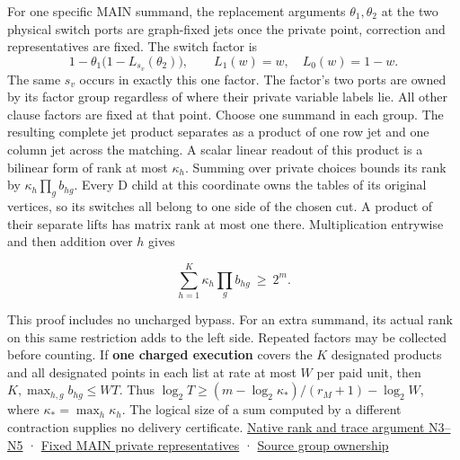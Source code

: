 \documentclass[11pt,a4paper]{article}
\begin{document}
For one specific MAIN summand, the replacement arguments
\(\theta_1,\theta_2\) at the two physical switch ports are graph-fixed
jets once the private point, correction and representatives are fixed.
The switch factor is \[
      1-\theta_1\bigl(1-L_{s_v}(\theta_2)\bigr),
      \qquad L_1(w)=w,\quad L_0(w)=1-w .
\] The same \(s_v\) occurs in exactly this one factor. The factor's two
ports are owned by its factor group regardless of where their private
variable labels lie. All other clause factors are fixed at that point.
Choose one summand in each group. The resulting complete jet product
separates as a product of one row jet and one column jet across the
matching. A scalar linear readout of this product is a bilinear form of
rank at most \(\kappa_h\). Summing over private choices bounds its rank
by \(\kappa_h\prod_g b_{hg}\). Every D child at this coordinate owns the
tables of its original vertices, so its switches all belong to one side
of the chosen cut. A product of their separate lifts has matrix rank at
most one there. Multiplication entrywise and then addition over \(h\)
gives

\[
                    \sum_{h=1}^{K}\kappa_h\prod_g b_{hg}
                         \ \ge\ 2^m.                                \tag{C3}
\]

This proof includes no uncharged bypass. For an extra summand, its
actual rank on this same restriction adds to the left side. Repeated
factors may be collected before counting. If \textbf{one charged
execution} covers the \(K\) designated products and all designated
points in each list at rate at most \(W\) per paid unit, then
\(K,\max_{h,g}b_{hg}\le WT\). Thus
\(\log_2 T\ge (m-\log_2\kappa_*)/(r_M+1)-\log_2 W\), where
\(\kappa_*=\max_h\kappa_h\). The logical size of a sum computed by a
different contraction supplies no delivery certificate.
\hyperref[v8-section-native-escape]{Native rank and trace argument N3--N5}
·
\href{https://github.com/openai/math/blob/main/preprints/The-Exponential-Time-Hypothesis-is-False-October-25-2026/build/main_full_version.tex\#L1810}{Fixed
MAIN private representatives} ·
\href{https://github.com/openai/math/blob/main/preprints/The-Exponential-Time-Hypothesis-is-False-October-25-2026/build/main_full_version.tex\#L1964}{Source
group ownership}
\end{document}
